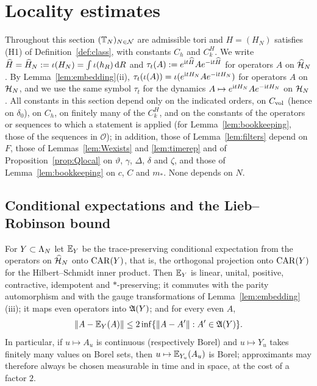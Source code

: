 \section{Locality estimates}\label{sec:locality}

Throughout this section $(\mathbb{T}_N)_{N\in\mathcal N}$ are admissible tori and $H=(H_N)$ satisfies (H1) of
Definition~\ref{def:class}, with constants $C_h$ and $C^H_k$. We write $\widehat{H}=\widehat{H}_N:=\iota(H_N)=\int\iota(h_R)\,\mathrm{d} R$
and $\tau_t(A):=e^{\mathrm{i} t\widehat{H}}Ae^{-\mathrm{i} t\widehat{H}}$ for operators $A$ on $\widehat{\mathcal{H}}_N$. By Lemma~\ref{lem:embedding}(ii),
$\tau_t(\iota(A))=\iota(e^{\mathrm{i} tH_N}Ae^{-\mathrm{i} tH_N})$ for operators $A$ on $\mathcal{H}_N$, and we use the same symbol $\tau_t$
for the dynamics $A\mapsto e^{\mathrm{i} tH_N}Ae^{-\mathrm{i} tH_N}$ on $\mathcal{H}_N$. All constants in this section depend only on
the indicated orders, on $C_{\mathrm{vol}}$ (hence on $\delta_0$), on $C_h$, on finitely many of the $C^H_k$, and on the
constants of the operators or sequences to which a statement is applied (for Lemma~\ref{lem:bookkeeping}, those of
the sequences in $\mathcal O$); in addition, those of Lemma~\ref{lem:filters} depend on $F$, those of
Lemmas~\ref{lem:Wexists} and \ref{lem:timerep} and of Proposition~\ref{prop:Qlocal} on $\vartheta$, $\gamma$, $\Delta$,
$\delta$ and $\zeta$, and those of Lemma~\ref{lem:bookkeeping} on $c$, $C$ and $m_*$. None depends on $N$.

\subsection{Conditional expectations and the Lieb--Robinson bound}

\begin{lemma}\label{lem:condexp}
For $Y\subset\Lambda_N$ let $\mathbb{E}_Y$ be the trace-preserving conditional expectation from the operators on $\widehat{\mathcal{H}}_N$
onto $\mathrm{CAR}(Y)$, that is, the orthogonal projection onto $\mathrm{CAR}(Y)$ for the Hilbert--Schmidt inner product. Then
$\mathbb{E}_Y$ is linear, unital, positive, contractive, idempotent and $*$-preserving; it commutes with the parity
automorphism and with the gauge transformations of Lemma~\ref{lem:embedding}(iii); it maps even operators into
$\mathfrak{A}(Y)$; and for every even $A$,
\[
\lVert A-\mathbb{E}_Y(A)\rVert\le2\inf\{\lVert A-A'\rVert:A'\in\mathfrak{A}(Y)\}.
\]
In particular, if $u\mapsto A_u$ is continuous (respectively Borel) and $u\mapsto Y_u$ takes finitely many
values on Borel sets, then $u\mapsto\mathbb{E}_{Y_u}(A_u)$ is Borel; approximants may therefore always be chosen
measurable in time and in space, at the cost of a factor $2$.
\end{lemma}

